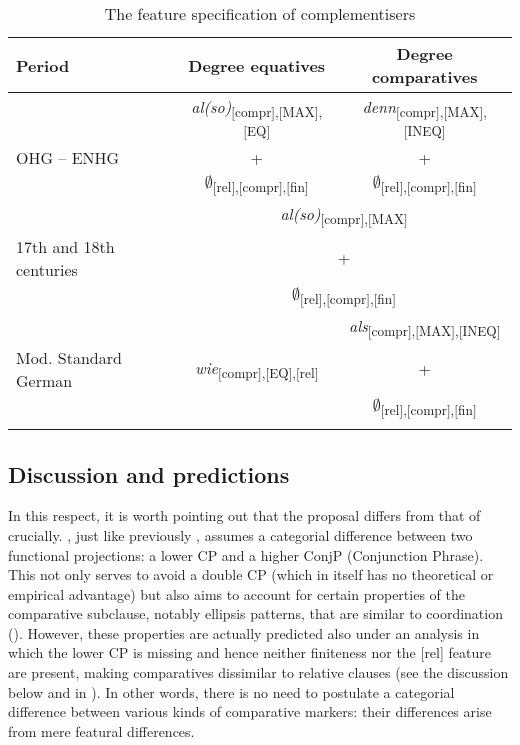 \begin{table}
\begin{tabular}{lcc}
\lsptoprule
Period & Degree equatives & Degree comparatives \\\midrule
{} & \textit{al(so)}\textsubscript{{[}compr{]},{[}MAX{]},{[}EQ{]}} & \textit{denn}\textsubscript{{[}compr{]},{[}MAX{]},{[}INEQ{]}}\\
OHG -- ENHG & + & +\\
{} & $\emptyset$\textsubscript{{[}rel{]},{[}compr{]},{[}fin{]}} & $\emptyset$\textsubscript{{[}rel{]},{[}compr{]},{[}fin{]}}\\
\midrule
{} & \multicolumn{2}{c}{\textit{al(so)}\textsubscript{{[}compr{]},{[}MAX{]}}}\\
17th and 18th centuries & \multicolumn{2}{c}{+}\\
{} & \multicolumn{2}{c}{$\emptyset$\textsubscript{{[}rel{]},{[}compr{]},{[}fin{]}}}\\
\midrule
{} & {} & \textit{als}\textsubscript{{[}compr{]},{[}MAX{]},{[}INEQ{]}}\\
Mod. Standard German & \textit{wie}\textsubscript{{[}compr{]},{[}EQ{]},{[}rel{]}} & +\\
{} & {} & $\emptyset$\textsubscript{{[}rel{]},{[}compr{]},{[}fin{]}}\\
\lspbottomrule
\end{tabular}
\caption{The feature specification of complementisers}
\label{tablealswiesum}
\end{table}

\subsection{Discussion and predictions} \label{sec:5discussion}
In this respect, it is worth pointing out that the proposal differs from that of \citet{jaeger2018} crucially. \citet[448--482]{jaeger2018}, just like previously \citet{jaeger2010}, assumes a categorial difference between two functional projections: a lower CP and a higher ConjP (Conjunction Phrase). This not only serves to avoid a double CP (which in itself has no theoretical or empirical advantage) but also aims to account for certain properties of the comparative subclause, notably ellipsis patterns, that are similar to coordination (\citealt[491--517]{jaeger2018}). However, these properties are actually predicted also under an analysis in which the lower CP is missing and hence neither finiteness nor the [rel] feature are present, making comparatives dissimilar to relative clauses (see the discussion below and in ). In other words, there is no need to postulate a categorial difference between various kinds of comparative markers: their differences arise from mere featural differences.

